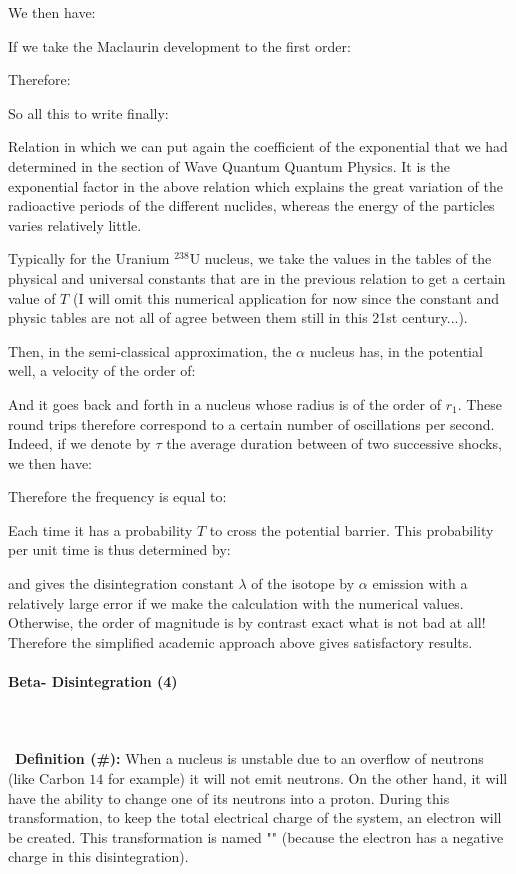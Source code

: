 	We then have:
	
	If we take the Maclaurin development to the first order:
	
	Therefore:
	
	So all this to write finally:
	
	Relation in which we can put again the coefficient of the exponential that we had determined in the section of Wave Quantum Quantum Physics. It is the exponential factor in the above relation which explains the great variation of the radioactive periods of the different nuclides, whereas the energy of the particles varies relatively little.
	
	Typically for the Uranium $^{238}\mathrm{U}$ nucleus, we take the values in the tables of the physical and universal constants that are in the previous relation to get a certain value of $T$ (I will omit this numerical application for now since the constant and physic tables are not all of agree between them still in this 21st century...).
	
	Then, in the semi-classical approximation, the $\alpha$ nucleus has, in the potential well, a velocity of the order of:
	
	And it goes back and forth in a nucleus whose radius is of the order of $r_1$. These round trips therefore correspond to a certain number of oscillations per second. Indeed, if we denote by $\tau$ the average duration between of two successive shocks, we then have:
	
	Therefore the frequency is equal to:
	
	Each time it has a probability $T$ to cross the potential barrier. This probability per unit time is thus determined by:
	
	and gives the disintegration constant $\lambda$ of the isotope by $\alpha$ emission with a relatively large error if we make the calculation with the numerical values. Otherwise, the order of magnitude is by contrast exact what is not bad at all! Therefore the simplified academic approach above gives satisfactory results.
	
	\pagebreak
	\paragraph{Beta- Disintegration (4)}\mbox{}\\\\\
	\textbf{Definition (\#\mydef):} When a nucleus is unstable due to an overflow of neutrons (like Carbon $14$ for example) it will not emit neutrons. On the other hand, it will have the ability to change one of its neutrons into a proton. During this transformation, to keep the total electrical charge of the system, an electron will be created. This transformation is named "" (because the electron has a negative charge in this disintegration).
	
